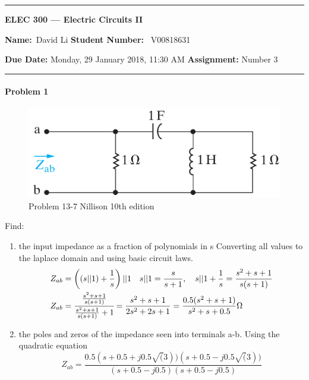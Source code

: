 \begin{center}
	\hrule
	\vspace{.4cm}
	{\textbf { \large ELEC 300 --- Electric Circuits II}}
\end{center}
{\textbf{Name:}\ David Li \hspace{\fill} \textbf{Student Number:}} \ V00818631  \\
{\textbf{Due Date:} Monday, 29 January 2018, 11:30 AM \hspace{\fill} \textbf{Assignment:} Number 3 \\
	\hrule
	
\paragraph{Problem 1}
\begin{figure}[h]
	\centering
	\includegraphics[width=1\linewidth]{images/Nil10th13-7}
	\caption{Problem 13-7 Nillison 10th edition}
	\label{fig:nil10th13-7}
\end{figure}
Find:
\begin{enumerate}[label=\alph*)]
	\item the input impedance as a fraction of polynomials in s
	Converting all values to the laplace domain and using basic circuit laws.
	\begin{align*}
	& Z_{ab}=\left( \left( s || 1\right) + \frac{1}{s} \right) || 1 \quad 
	s||1 = \frac{s}{s+1}, \quad 
	s||1 + \frac{1}{s}=\frac{s^2+s+1}{s(s+1)} \\
	& Z_{ab} = \cfrac{\frac{s^2+s+1}{s(s+1)}}{\frac{s^2+s+1}{s(s+1)}+1}= \frac{s^2+s+1}{2s^2+2s+1}=\frac{0.5(s^2+s+1)}{s^2+s+0.5} \Omega
	\end{align*}
	\item the poles and zeros of the impedance seen into terminals a-b.
	Using the quadratic equation
	\[
	Z_{ab} = \frac{0.5(s+0.5+j0.5\sqrt(3))(s+0.5-j0.5\sqrt(3))}{(s+0.5-j0.5)(s+0.5-j0.5)}
	\] 
\end{enumerate}

}

